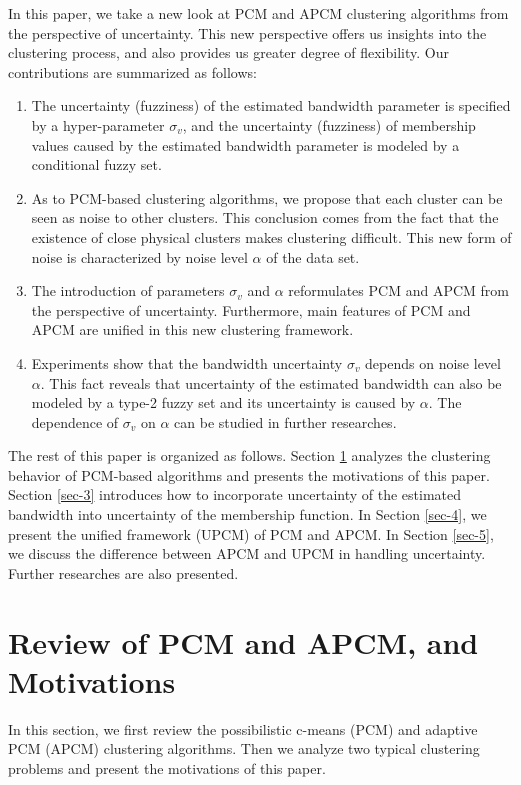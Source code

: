 \documentclass[journal,transmag]{IEEEtran}
\theoremstyle{definition}
\begin{document}
In this paper, we take a new look at PCM and APCM clustering algorithms from the perspective of uncertainty. This new perspective offers us insights into the clustering process, and also provides us greater degree of flexibility.
Our contributions are summarized as follows:
\begin{enumerate}
\item The uncertainty (fuzziness) of the estimated bandwidth parameter is specified by a hyper-parameter $\sigma_v$, and the uncertainty (fuzziness) of membership values caused by the estimated bandwidth parameter is modeled by a conditional fuzzy set.
\item As to PCM-based clustering algorithms, we propose that each cluster can be seen as noise to other clusters. This conclusion comes from the fact that the existence of close physical clusters makes clustering difficult. This new form of noise is characterized by noise level $\alpha$ of the data set.
\item The introduction of parameters $\sigma_v$ and $\alpha$ reformulates PCM and APCM from the perspective of uncertainty. Furthermore, main features of PCM and APCM are unified in this new clustering framework.
\item Experiments show that the bandwidth uncertainty $\sigma_v$ depends on noise level $\alpha$.
This fact reveals that uncertainty of the estimated bandwidth can also be modeled by a type-2 fuzzy set and its uncertainty is caused by $\alpha$. The dependence of $\sigma_v$ on $\alpha$ can be studied in further researches.
\end{enumerate}

The rest of this paper is organized as follows. Section \ref{sec-2} analyzes the clustering behavior of PCM-based algorithms and presents the motivations of this paper. Section \ref{sec-3} introduces how to incorporate uncertainty of the estimated bandwidth into uncertainty of the membership function. In Section \ref{sec-4}, we present the unified framework (UPCM) of PCM and APCM. In Section \ref{sec-5}, we discuss the difference between APCM and UPCM in handling uncertainty. Further researches are also presented.
\section{Review of PCM and APCM, and Motivations}
\label{sec-2}
In this section, we first review the possibilistic c-means (PCM) and adaptive PCM (APCM) clustering algorithms. Then we analyze two typical clustering problems and present the motivations of this paper.
\end{document}

